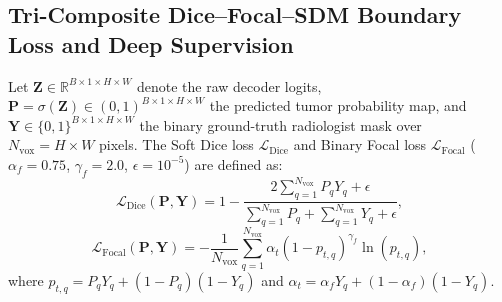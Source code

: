\documentclass[conference]{IEEEtran}
\begin{document}
\subsection{Tri-Composite Dice--Focal--SDM Boundary Loss and Deep Supervision}
Let $\mathbf{Z} \in \mathbb{R}^{B \times 1 \times H \times W}$ denote the raw decoder logits, $\mathbf{P} = \sigma(\mathbf{Z}) \in (0,1)^{B \times 1 \times H \times W}$ the predicted tumor probability map, and $\mathbf{Y} \in \{0,1\}^{B \times 1 \times H \times W}$ the binary ground-truth radiologist mask over $N_{\text{vox}} = H \times W$ pixels. The Soft Dice loss $\mathcal{L}_{\text{Dice}}$ and Binary Focal loss $\mathcal{L}_{\text{Focal}}$ ($\alpha_f = 0.75$, $\gamma_f = 2.0$, $\epsilon = 10^{-5}$) are defined as:
\begin{equation}
    \mathcal{L}_{\text{Dice}}(\mathbf{P}, \mathbf{Y}) = 1 - \frac{2 \sum_{q=1}^{N_{\text{vox}}} P_q Y_q + \epsilon}{\sum_{q=1}^{N_{\text{vox}}} P_q + \sum_{q=1}^{N_{\text{vox}}} Y_q + \epsilon},
    \label{eq:dice_loss}
\end{equation}
\begin{equation}
    \mathcal{L}_{\text{Focal}}(\mathbf{P}, \mathbf{Y}) = -\frac{1}{N_{\text{vox}}}\sum_{q=1}^{N_{\text{vox}}} \alpha_t (1 - p_{t,q})^{\gamma_f} \ln(p_{t,q}),
    \label{eq:focal_loss}
\end{equation}
where $p_{t,q} = P_q Y_q + (1 - P_q)(1 - Y_q)$ and $\alpha_t = \alpha_f Y_q + (1 - \alpha_f)(1 - Y_q)$.
\end{document}
